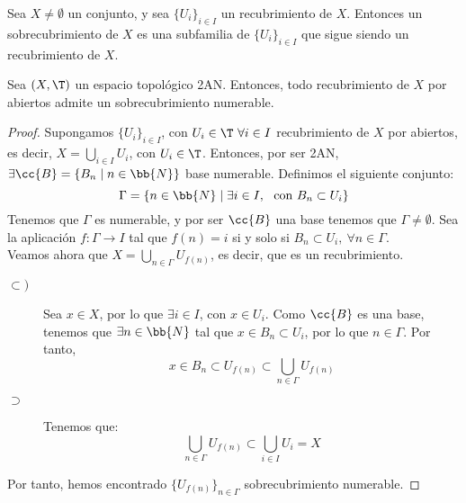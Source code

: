 \begin{definicion}[Sobrecubrimiento]
    Sea $X\neq \emptyset$ un conjunto, y sea $\{U_i\}_{i\in I}$ un recubrimiento de $X$. Entonces un sobrecubrimiento de $X$ es una subfamilia de $\{U_i\}_{i\in I}$ que sigue siendo un recubrimiento de $X$.
\end{definicion}


\begin{prop}
    Sea $(X,\T)$ un espacio topológico 2AN. Entonces, todo recubrimiento de $X$ por abiertos admite un sobrecubrimiento numerable.
\end{prop}
\begin{proof}
    Supongamos $\{U_i\}_{i\in I}$, con $U_i\in \T~\forall i\in I$ recubrimiento de $X$ por abiertos, es decir, $X=\bigcup\limits_{i\in I} U_i$, con $U_i\in \T$. Entonces, por ser 2AN, $\exists \cc{B}=\{B_n\mid n\in \bb{N}\}$ base numerable. Definimos el siguiente conjunto:
    \begin{equation*}
        \Gamma = \{n\in \bb{N}\mid \exists i\in I,~\text{ con }B_n\subset U_i\}
    \end{equation*}
    Tenemos que $\Gamma$ es numerable, y por ser $\cc{B}$ una base tenemos que $\Gamma\neq \emptyset$. Sea la aplicación $f:\Gamma\to I$ tal que $f(n)=i$ si y solo si $B_{n}\subset U_{i},~\forall n\in \Gamma$.\\

    Veamos ahora que $X=\bigcup\limits_{n\in \Gamma}U_{f(n)}$, es decir, que es un recubrimiento.
    \begin{description}
        \item[$\subset)$] Sea $x\in X$, por lo que $\exists i\in I$, con $x\in U_i$. Como $\cc{B}$ es una base, tenemos que $\exists n\in \bb{N}$ tal que $x\in B_n\subset U_i$, por lo que $n\in \Gamma$. Por tanto, $$x\in B_n\subset U_{f(n)} \subset \bigcup\limits_{n\in \Gamma}U_{f(n)}$$

        \item[$\supset$] Tenemos que:
        $$\bigcup\limits_{n\in \Gamma}U_{f(n)} \subset \bigcup\limits_{i\in I}U_{i}=X$$
    \end{description}

    Por tanto, hemos encontrado $\{U_{f(n)}\}_{n\in \Gamma}$ sobrecubrimiento numerable.
\end{proof}